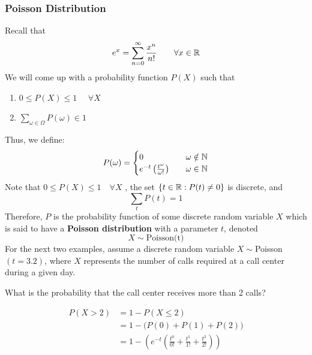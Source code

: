\documentclass{article}
\begin{document}
	\subsubsection{Poisson Distribution}
		Recall that 
		$$ e^x = \sum_{n=0}^\infty \frac{x^n}{n!} \quad\quad \forall x \in \mathbb{R}$$
		We will come up with a probability function $P(X)$ such that 
		\begin{enumerate}
			\item $0 \leq P(X) \leq 1$ $\quad \forall X$
			\item $\sum_{\omega \in \Omega} P(\omega) \in 1$
		\end{enumerate}
		Thus, we define:
		$$ P(\omega) = 
			\begin{cases}
				0	&\quad	\omega \notin \mathbb{N} \\
				e^{-t}\left( \frac{t^\omega}{\omega!} \right)&\quad \omega \in \mathbb{N}
			\end{cases}
		$$
		Note that $0\leq P(X) \leq 1 \quad \forall  X$ , the set $\{ t \in \mathbb{R}: P(t) \neq 0\}$ is discrete, and $$\sum_t P(t) = 1$$
		Therefore, $P$ is the probability function of some discrete random variable $X$ which is said to have a \textbf{Poisson distribution} with a parameter $t$, denoted
		$$ X \sim \text{Poisson(t)}$$
		For the next two examples, assume a discrete random variable $X\sim$Poisson$(t=3.2)$, where $X$ represents the number of calls required at a call center during a given day. 
	\pagebreak
		\begin{exmp}
			What is the probability that the call center receives more than 2 calls?
			\begin{sol}
				\begin{align*}
					P(X > 2) &= 1 - P(X \leq 2) \\
					&= 1 - \big( P(0) + P(1) + P(2) \big) \\
					&= 1 - \left( e^{-t} \left( \frac{t^0}{0!} + \frac{t^1}{1!} + \frac{t^2}{2!} \right) \right)
				\end{align*}
			\end{sol}
		\end{exmp}
\end{document}
